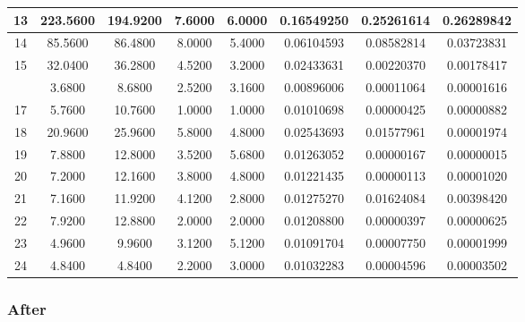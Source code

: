\documentclass[12pt,a4paper]{thesis}
\begin{document}
\begin{table}[H]
\begin{tabular}{|c|c|c|c|c|c|c|c|}
\hline	13	&	223.5600	&	194.9200	&	7.6000	&	6.0000	&	0.16549250	&	0.25261614	&	0.26289842	\\
\hline	14	&	85.5600	&	86.4800	&	8.0000	&	5.4000	&	0.06104593	&	0.08582814	&	0.03723831	\\
\hline	15	&	32.0400	&	36.2800	&	4.5200	&	3.2000	&	0.02433631	&	0.00220370	&	0.00178417	\\
\rowcolor{yellow}
\hline	16	&	3.6800	&	8.6800	&	2.5200	&	3.1600	&	0.00896006	&	0.00011064	&	0.00001616	\\
\hline	17	&	5.7600	&	10.7600	&	1.0000	&	1.0000	&	0.01010698	&	0.00000425	&	0.00000882	\\
\hline	18	&	20.9600	&	25.9600	&	5.8000	&	4.8000	&	0.02543693	&	0.01577961	&	0.00001974	\\
\hline	19	&	7.8800	&	12.8000	&	3.5200	&	5.6800	&	0.01263052	&	0.00000167	&	0.00000015	\\
\hline	20	&	7.2000	&	12.1600	&	3.8000	&	4.8000	&	0.01221435	&	0.00000113	&	0.00001020	\\
\hline	21	&	7.1600	&	11.9200	&	4.1200	&	2.8000	&	0.01275270	&	0.01624084	&	0.00398420	\\
\hline	22	&	7.9200	&	12.8800	&	2.0000	&	2.0000	&	0.01208800	&	0.00000397	&	0.00000625	\\
\hline	23	&	4.9600	&	9.9600	&	3.1200	&	5.1200	&	0.01091704	&	0.00007750	&	0.00001999	\\
\hline	24	&	4.8400	&	4.8400	&	2.2000	&	3.0000	&	0.01032283	&	0.00004596	&	0.00003502	\\
\hline 
\end{tabular} 
\label{tab:agentNodeBefore}
\end{table}

\subsubsection{After}
\end{document}
